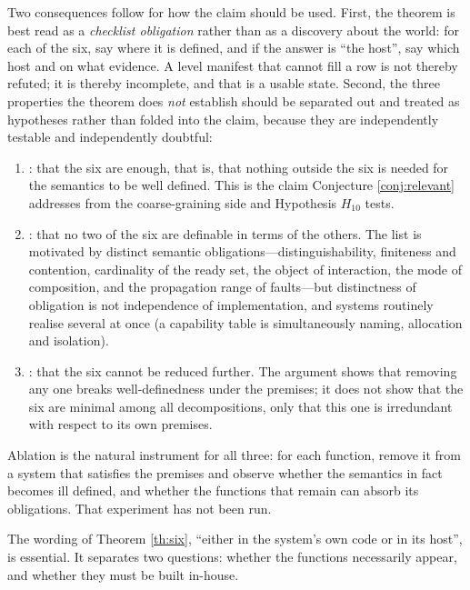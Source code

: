 \begin{remark}
Two consequences follow for how the claim should be used. First, the theorem is best read as a
\emph{checklist obligation} rather than as a discovery about the world: for each of the six, say
where it is defined, and if the answer is ``the host'', say which host and on what evidence. A level
manifest that cannot fill a row is not thereby refuted; it is thereby incomplete, and that is a
usable state. Second, the three properties the theorem does \emph{not} establish should be separated
out and treated as hypotheses rather than folded into the claim, because they are independently
testable and independently doubtful:
\begin{enumerate}[label=(\alph*)]
\item {}: that the six are enough, that is, that nothing outside the six is needed
      for the semantics to be well defined. This is the claim Conjecture \ref{conj:relevant} addresses
      from the coarse-graining side and Hypothesis $H_{10}$ tests.
\item {}: that no two of the six are definable in terms of the others. The
      list is motivated by distinct semantic obligations---distinguishability, finiteness and
      contention, cardinality of the ready set, the object of interaction, the mode of composition,
      and the propagation range of faults---but distinctness of obligation is not independence of
      implementation, and systems routinely realise several at once (a capability table is
      simultaneously naming, allocation and isolation).
\item {}: that the six cannot be reduced further. The argument shows that removing
      any one breaks well-definedness under the premises; it does not show that the six are minimal
      among all decompositions, only that this one is irredundant with respect to its own premises.
\end{enumerate}
Ablation is the natural instrument for all three: for each function, remove it from a system that
satisfies the premises and observe whether the semantics in fact becomes ill defined, and whether
the functions that remain can absorb its obligations. That experiment has not been run.
\end{remark}

The wording of Theorem \ref{th:six}, ``either in the system's own code or in its host'', is
essential. It separates two questions: whether the functions necessarily appear, and whether
they must be built in-house.

